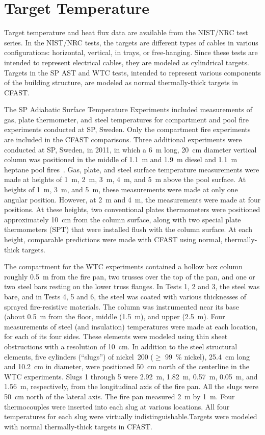 \section{Target Temperature}

Target temperature and heat flux data are available from the NIST/NRC test series.  In the NIST/NRC tests, the targets are different types of cables in various configurations: horizontal, vertical, in trays, or free-hanging. Since these tests are intended to represent electrical cables, they are modeled as cylindrical targets. Targets in the SP AST and WTC tests, intended to represent various components of the building structure, are modeled as normal thermally-thick targets in CFAST.

The SP Adiabatic Surface Temperature Experiments included measurements of gas, plate thermometer, and steel temperatures for compartment and pool fire experiments conducted at SP, Sweden. Only the compartment fire experiments are included in the CFAST comparisons. Three additional experiments were conducted at SP, Sweden, in 2011, in which a 6~m long, 20~cm diameter vertical column was positioned in the middle of 1.1~m and 1.9~m diesel and 1.1~m heptane pool fires~\cite{Sjostrom:AST}. Gas, plate, and steel surface temperature measurements were made at heights of 1~m, 2~m, 3~m, 4~m, and 5~m above the pool surface. At heights of 1~m, 3~m, and 5~m, these measurements were made at only one angular position. However, at 2~m and 4~m, the measurements were made at four positions. At these heights, two conventional plates thermometers were positioned approximately 10~cm from the column surface, along with two special plate thermometers (SPT) that were installed flush with the column surface. At each height, comparable predictions were made with CFAST using normal, thermally-thick targets.

The compartment for the WTC experiments contained a hollow box column roughly 0.5~m from the fire pan, two trusses over the top of the pan, and one or two steel bars resting on the lower truss flanges. In Tests 1, 2 and 3, the steel was bare, and in Tests 4, 5 and 6, the steel was coated with various thicknesses of sprayed fire-resistive materials. The column was instrumented near its base (about 0.5~m from the floor, middle (1.5~m), and upper (2.5~m). Four measurements of steel (and insulation) temperatures were made at each location, for each of its four sides. These elements were modeled using thin sheet obstructions with a resolution of 10~cm. In addition to the steel structural elements, five cylinders (``slugs'') of nickel~200 ($\ge$ 99~\% nickel), 25.4~cm long and 10.2~cm in diameter, were positioned 50~cm north of the centerline in the WTC experiments. Slugs 1 through 5 were 2.92~m, 1.82~m, 0.57~m, 0.05~m, and 1.56~m, respectively, from the longitudinal axis of the fire pan. All the slugs were 50~cm north of the lateral axis. The fire pan measured 2~m by 1~m. Four thermocouples were inserted into each slug at various locations. All four temperatures for each slug were virtually indistinguishable.Targets were modeled with normal thermally-thick targets in CFAST.

